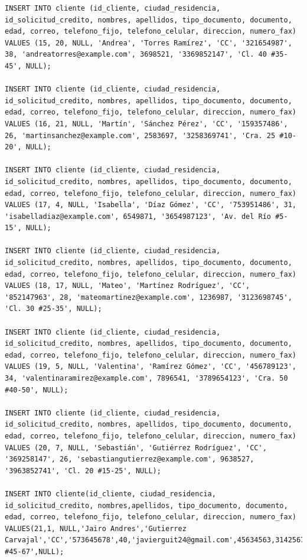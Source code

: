 \documentclass{article}
\begin{document}
\begin{lstlisting}
INSERT INTO cliente (id_cliente, ciudad_residencia, id_solicitud_credito, nombres, apellidos, tipo_documento, documento, edad, correo, telefono_fijo, telefono_celular, direccion, numero_fax)
VALUES (15, 20, NULL, 'Andrea', 'Torres Ramírez', 'CC', '321654987', 38, 'andreatorres@example.com', 3698521, '3369852147', 'Cl. 40 #35-45', NULL);

INSERT INTO cliente (id_cliente, ciudad_residencia, id_solicitud_credito, nombres, apellidos, tipo_documento, documento, edad, correo, telefono_fijo, telefono_celular, direccion, numero_fax)
VALUES (16, 21, NULL, 'Martín', 'Sánchez Pérez', 'CC', '159357486', 26, 'martinsanchez@example.com', 2583697, '3258369741', 'Cra. 25 #10-20', NULL);

INSERT INTO cliente (id_cliente, ciudad_residencia, id_solicitud_credito, nombres, apellidos, tipo_documento, documento, edad, correo, telefono_fijo, telefono_celular, direccion, numero_fax)
VALUES (17, 4, NULL, 'Isabella', 'Díaz Gómez', 'CC', '753951486', 31, 'isabelladiaz@example.com', 6549871, '3654987123', 'Av. del Río #5-15', NULL);

INSERT INTO cliente (id_cliente, ciudad_residencia, id_solicitud_credito, nombres, apellidos, tipo_documento, documento, edad, correo, telefono_fijo, telefono_celular, direccion, numero_fax)
VALUES (18, 17, NULL, 'Mateo', 'Martínez Rodríguez', 'CC', '852147963', 28, 'mateomartinez@example.com', 1236987, '3123698745', 'Cl. 30 #25-35', NULL);

INSERT INTO cliente (id_cliente, ciudad_residencia, id_solicitud_credito, nombres, apellidos, tipo_documento, documento, edad, correo, telefono_fijo, telefono_celular, direccion, numero_fax)
VALUES (19, 5, NULL, 'Valentina', 'Ramírez Gómez', 'CC', '456789123', 34, 'valentinaramirez@example.com', 7896541, '3789654123', 'Cra. 50 #40-50', NULL);

INSERT INTO cliente (id_cliente, ciudad_residencia, id_solicitud_credito, nombres, apellidos, tipo_documento, documento, edad, correo, telefono_fijo, telefono_celular, direccion, numero_fax)
VALUES (20, 7, NULL, 'Sebastián', 'Gutiérrez Rodríguez', 'CC', '369258147', 26, 'sebastiangutierrez@example.com', 9638527, '3963852741', 'Cl. 20 #15-25', NULL);

INSERT INTO cliente(id_cliente, ciudad_residencia, id_solicitud_credito, nombres,apellidos, tipo_documento, documento, edad, correo, telefono_fijo, telefono_celular, direccion, numero_fax)
VALUES(21,1, NULL,'Jairo Andres','Gutierrez Carvajal','CC','573645678',40,'javierguit24@gmail.com',45634563,3142567841,'cra.5 #45-67',NULL);
\end{lstlisting}
\end{document}
